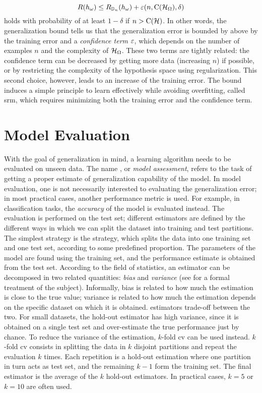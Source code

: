 $$R(h_{\omega}) \leq R_{\Data_n}(h_{\omega}) + \eps(n, \Fun{C}(\HypSpace), \delta)$$
holds with probability of at least $1 - \delta$ if $n > \Fun{C}(\Cal{H})$. In other words, the generalization bound tells us that the generalization error is bounded by above by the training error and a \emph{confidence term} $\varepsilon$, which depends on the number of examples $n$ and the complexity of $\HypSpace$. These two terms are tightly related: the confidence term can be decreased by getting more data (increasing $n$) if possible, or by restricting the complexity of the hypothesis space using regularization. This second choice, however, leads to an increase of the training error. The bound induces a simple principle to learn effectively while avoiding overfitting, called \gls{srm}, which requires minimizing both the training error and the confidence term.

\section{Model Evaluation}\label{sec:model-selection}
With the goal of generalization in mind, a learning algorithm needs to be evaluated on unseen data. The name , or \emph{model assessment}, refers to the task of getting a proper estimate of generalization capability of the model. In model evaluation, one is not necessarily interested to evaluating the generalization error; in most practical cases, another performance metric is used. For example, in classification tasks, the \emph{accuracy} of the model is evaluated instead. The evaluation is performed on the test set; different estimators are defined by the different ways in which we can split the dataset into training and test partitions. The simplest strategy is the  strategy, which splits the data into one training set and one test set, according to some predefined proportion. The parameters of the model are found using the training set, and the performance estimate is obtained from the test set. According to the field of statistics, an estimator can be decomposed in two related quantities: \emph{bias} and \emph{variance} (see \eg \cite{?} for a formal treatment of the subject). Informally, bias is related to how much the estimation is close to the true value; variance is related to how much the estimation depends on the specific dataset on which it is obtained.  estimators trade-off between the two. For small datasets, the hold-out estimator has high variance, since it is obtained on a single test set and over-estimate the true performance just by chance. To reduce the variance of the estimation, $k$-fold \gls{cv} can be used instead. $k$-fold \gls{cv} consists in splitting the data in $k$ disjoint partitions and repeat the evaluation $k$ times. Each repetition is a hold-out estimation where one partition in turn acts as test set, and the remaining $k-1$ form the training set. The final estimator is the average of the $k$ hold-out estimators. In practical cases, $k=5$ or $k=10$ are often used. 

